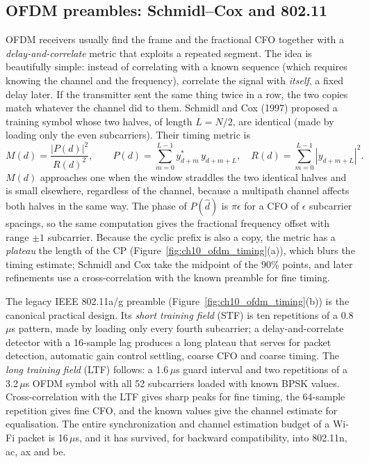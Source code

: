 
\subsection{OFDM preambles: Schmidl--Cox and 802.11}

OFDM receivers usually find the frame and the fractional CFO together with a \emph{delay-and-correlate}
metric that exploits a repeated segment. The idea is beautifully simple: instead of correlating with
a known sequence (which requires knowing the channel and the frequency), correlate the signal with
\emph{itself}, a fixed delay later. If the transmitter sent the same thing twice in a row, the two
copies match whatever the channel did to them. Schmidl and Cox (1997) proposed a training symbol whose
two halves, of length $L=N/2$, are identical (made by loading only the even subcarriers). Their timing
metric is
\begin{equation}
M(d)=\frac{|P(d)|^2}{R(d)^2},\qquad P(d)=\sum_{m=0}^{L-1}y_{d+m}^*\,y_{d+m+L},\quad R(d)=\sum_{m=0}^{L-1}|y_{d+m+L}|^2.
\end{equation}
$M(d)$ approaches one when the window straddles the two identical halves and is small elsewhere,
regardless of the channel, because a multipath channel affects both halves in the same way. The
phase of $P(\hat d)$ is $\pi\epsilon$ for a CFO of $\epsilon$ subcarrier spacings, so the same computation
gives the fractional frequency offset with range $\pm1$ subcarrier. Because the cyclic prefix is also a
copy, the metric has a \emph{plateau} the length of the CP (Figure~\ref{fig:ch10_ofdm_timing}(a)), which
blurs the timing estimate; Schmidl and Cox take the midpoint of the 90\% points, and later refinements
use a cross-correlation with the known preamble for fine timing.

The legacy IEEE 802.11a/g preamble (Figure~\ref{fig:ch10_ofdm_timing}(b)) is the canonical practical
design. Its \emph{short training field} (STF) is ten repetitions of a 0.8\,$\mu$s pattern, made by
loading only every fourth subcarrier; a delay-and-correlate detector with a 16-sample lag produces a
long plateau that serves for packet detection, automatic gain control settling, coarse CFO and
coarse timing. The \emph{long training field} (LTF) follows: a 1.6\,$\mu$s guard interval and two
repetitions of a 3.2\,$\mu$s OFDM symbol with all 52 subcarriers loaded with known BPSK values.
Cross-correlation with the LTF gives sharp peaks for fine timing, the 64-sample repetition gives fine
CFO, and the known values give the channel estimate for equalisation. The entire synchronization and
channel estimation budget of a Wi-Fi packet is 16\,$\mu$s, and it has survived, for backward
compatibility, into 802.11n, ac, ax and be.

